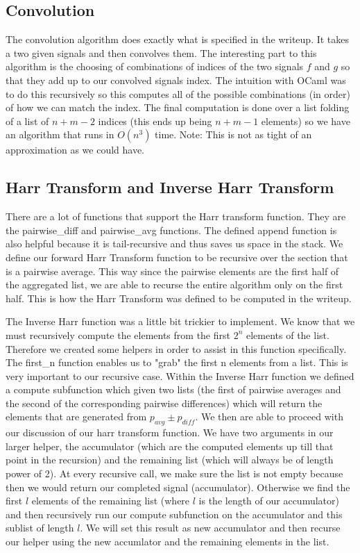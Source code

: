 \documentclass[11pt]{article} %
\begin{document}
\subsection{Convolution}
The convolution algorithm does exactly what is specified in the writeup. It takes a two given signals and then convolves them. The interesting part to this algorithm is the choosing of combinations of indices of the two signals $f$ and $g$ so that they add up to our convolved signals index. The intuition with OCaml was to do this recursively so this computes all of the possible combinations (in order) of how we can match the index. The final computation is done over a list folding of a list of $n + m - 2$ indices (this ends up being $n+m-1$ elements) so we have an algorithm that runs in $O(n^3)$ time. Note: This is not as tight of an approximation as we could have. 

\subsection{Harr Transform and Inverse Harr Transform}
There are a lot of functions that support the Harr transform function. They are the pairwise\_diff and  pairwise\_avg functions. The defined append function is also helpful because it is tail-recursive and thus saves us space in the stack. We define our forward Harr Transform function to be recursive over the section that is a pairwise average. This way since the pairwise elements are the first half of the aggregated list, we are able to recurse the entire algorithm only on the first half. This is how the Harr Transform was defined to be computed in the writeup. 

The Inverse Harr function was a little bit trickier to implement. We know that we must recursively compute the elements from the first  $2^n$ elements of the list. Therefore we created some helpers in order to assist in this function specifically. The first\_n function enables us to "grab" the first n elements from a list. This is very important to our recursive case. Within the Inverse Harr function we defined a compute subfunction which given two lists (the first of  pairwise averages and the second of the corresponding pairwise differences) which will return the elements that are generated from $p_{avg} \pm p_{diff}$. We then are able to proceed with our discussion of our harr transform function. We have two arguments in our larger helper, the accumulator (which are the computed elements up till that point in the recursion) and the remaining list (which will always be of length power of 2). At every recursive call, we make sure the list is not empty because then we would return our completed signal (accumulator). Otherwise we find the first $l$ elements of the remaining list (where $l$ is the length of our accumulator) and then recursively run our compute subfunction on the accumulator and this sublist of length $l$. We will set this result as new accumulator and then recurse our helper using the new accumlator and the remaining elements in the list. 
\end{document}
